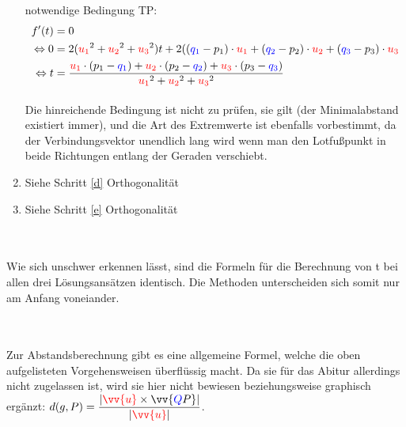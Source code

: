 \begin{enumerate}[1)]
                    \\
                    \\
                    notwendige Bedingung TP:
                    \begin{align*}
                        f'(t) &= 0 \\
                        \Leftrightarrow 0 &= 2(\textcolor{red}{u_1}^2 + \textcolor{red}{u_2}^2 + \textcolor{red}{u_3}^2)t + 2((\textcolor{blue}{q_1} - p_1) \cdot \textcolor{red}{u_1} + (\textcolor{blue}{q_2} - p_2) \cdot \textcolor{red}{u_2} + (\textcolor{blue}{q_3} - p_3) \cdot \textcolor{red}{u_3} \\
                        \Leftrightarrow t &= \dfrac{\textcolor{red}{u_1} \cdot (p_1 - \textcolor{blue}{q_1}) + \textcolor{red}{u_2} \cdot (p_2 - \textcolor{blue}{q_2}) + \textcolor{red}{u_3} \cdot (p_3 - \textcolor{blue}{q_3})}{\textcolor{red}{u_1}^2 + \textcolor{red}{u_2}^2 + \textcolor{red}{u_3}^2}
                    \end{align*}
                    \paragraph{} Die hinreichende Bedingung ist nicht zu prüfen, sie gilt (der Minimalabstand existiert immer), und die Art des Extremwerte
                    ist ebenfalls vorbestimmt, da der Verbindungsvektor unendlich lang wird wenn man den Lotfußpunkt in beide Richtungen entlang der
                    Geraden verschiebt.
                    \item Siehe Schritt \ref{d} Orthogonalität
                    \item Siehe Schritt \ref{e} Orthogonalität
                \end{enumerate}
        \\
        \begin{Bemerkung}
            \paragraph{} Wie sich unschwer erkennen lässt, sind die Formeln für die Berechnung von t bei allen drei Lösungsansätzen identisch. Die Methoden
            unterscheiden sich somit nur am Anfang voneiander.
        \end{Bemerkung}
        \\
        \begin{Bemerkung}
            \paragraph{} Zur Abstandsberechnung gibt es eine allgemeine Formel, welche die oben aufgelisteten Vorgehensweisen überflüssig macht. Da sie
            für das Abitur allerdings nicht zugelassen ist, wird sie hier nicht bewiesen beziehungsweise graphisch ergänzt:
            $d(g,P) = \dfrac{|\textcolor{red}{\vv{u}}\times\vv{\textcolor{blue}{Q}P}|}{|\textcolor{red}{\vv{u}}|}$.
        \end{Bemerkung}

